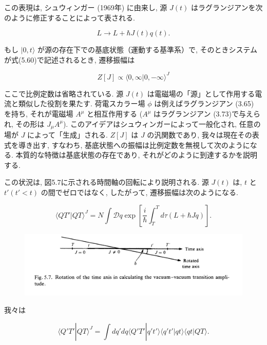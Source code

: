 \documentclass{jsarticle}
\begin{document}
この表現は, シュウィンガー (1969年) に由来し, 源 \( J(t) \) はラグランジアンを次のように修正することによって表される. 

\begin{equation*}
L \rightarrow L + \hbar J(t)q(t). \tag{5.60}
\end{equation*}

もし \( | 0, t \rangle \) が源の存在下での基底状態（運動する基準系）で, そのときシステムが式(5.60)で記述されるとき, 遷移振幅は

\begin{equation*}
Z[J] \propto \langle 0, \infty | 0, -\infty \rangle^J \tag{5.61}
\end{equation*}

ここで比例定数は省略されている. 源 \( J(t) \) は電磁場の「源」として作用する電流と類似した役割を果たす. 荷電スカラー場 \( \phi \) は例えばラグランジアン (3.65) を持ち, それが電磁場 \( A^\mu \) と相互作用する ($A^\mu$ はラグランジアン (3.73)で与えられ, その形は $J_\mu A^\mu$). このアイデアはシュウィンガーによって一般化され, 任意の場が \( J \) によって「生成」される. \( Z[J] \) は \( J \) の汎関数であり, 我々は現在その表式を導き出す, すなわち, 基底状態への振幅は比例定数を無視して次のようになる. 本質的な特徴は基底状態の存在であり, それがどのように到達するかを説明する.

この状況は, 図5.7に示される時間軸の回転により説明される. 源 \( J(t) \) は, \( t \) と \( t' (t' < t) \) の間でゼロではなく, したがって, 遷移振幅は次のようになる.

\begin{equation*}
\langle QT' | QT \rangle^J = N \int \mathcal{D}q \exp \left[ \frac{i}{\hbar} \int_T^T d\tau (L + \hbar Jq) \right]. \tag{5.62}
\end{equation*}

\begin{figure}[H]
    \centering
    \includegraphics[width=\textwidth]{figure/fig5-7.png}    
\end{figure}

我々は

\begin{equation*}
\langle Q'T' | QT \rangle^J = \int dq' dq \langle Q'T' | q't' \rangle \langle q't' | qt \rangle \langle qt | QT \rangle. \tag{5.63}
\end{equation*}
\end{document}
